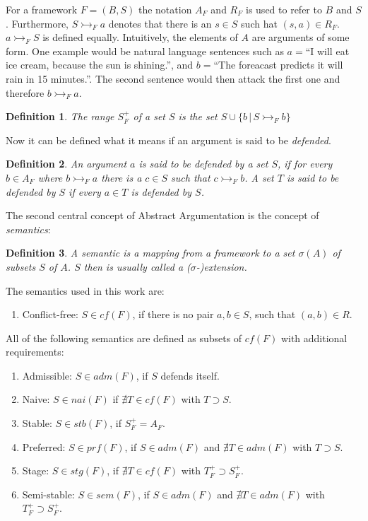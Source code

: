 \documentclass[parskip=half]{scrartcl}
\newtheorem{definition}{Definition}
\begin{document}
For a framework $F = (B, S)$ the notation $A_F$ and $R_F$ is used to refer to
$B$ and $S$. Furthermore, $S \rightarrowtail_F a$ denotes that there is an $s
\in S$ such hat $(s, a) \in R_F$. $a \rightarrowtail_F S$ is defined equally.
Intuitively, the elements of $A$ are arguments of some form.  One example would
be natural language sentences such as $a=$``I will eat ice cream, because the
sun is shining.'', and $b=$``The foreacast predicts it will rain in 15
minutes.''. The second sentence would then attack the first one and therefore $b
\rightarrowtail_F a$.
\begin{definition}
The \emph{range} $S_F^{+}$ of a set $S$ is the set $S \cup\{b\,|\,S
\rightarrowtail_F b\}$
\end{definition}

Now it can be defined what it means if an argument is said to be
\emph{defended}.
\begin{definition}
An argument $a$ is said to be \emph{defended} by a set $S$, if for every $b \in
A_F$ where $b \rightarrowtail_F a$ there is a $c \in S$ such that $c
\rightarrowtail_F b$. A set $T$ is said to be \emph{defended} by $S$ if every $a
\in T$ is defended by $S$.
\end{definition}

The second central concept of Abstract Argumentation is the concept of
 \emph{semantics}:
\begin{definition}
A \emph{semantic} is a mapping from a framework to a set $\sigma(A)$ of subsets
$S$ of $A$.  $S$ then is usually called a ($\sigma$-)extension.
\end{definition}

The semantics used in this work are:
\begin{enumerate}
  \item Conflict-free: $S \in cf(F)$, if there is no pair $a,b \in S$, such that
      $(a,b) \in R$.
\end{enumerate}
All of the following semantics are defined as subsets of $cf(F)$
with additional requirements:
\begin{enumerate}[resume]
  \item Admissible: $S \in adm(F)$, if $S$ defends itself.
  \item Naive: $S \in nai(F)$ if $\nexists T\in cf(F)$ with $T \supset S$.
  \item Stable: $S \in stb(F)$, if $S_F^{+} = A_F$.
  \item Preferred: $S \in prf(F)$, if $S \in adm(F)$ and $\nexists T\in adm(F)$
      with $T \supset S$.
  \item Stage: $S \in stg(F)$, if $\nexists T\in cf(F)$ with $T_F^{+} \supset
      S_F^{+}$.
  \item Semi-stable: $S \in sem(F)$, if $S \in adm(F)$ and $\nexists T\in
      adm(F)$ with $T_F^{+} \supset S_F^{+}$.
\end{enumerate}
\end{document}
